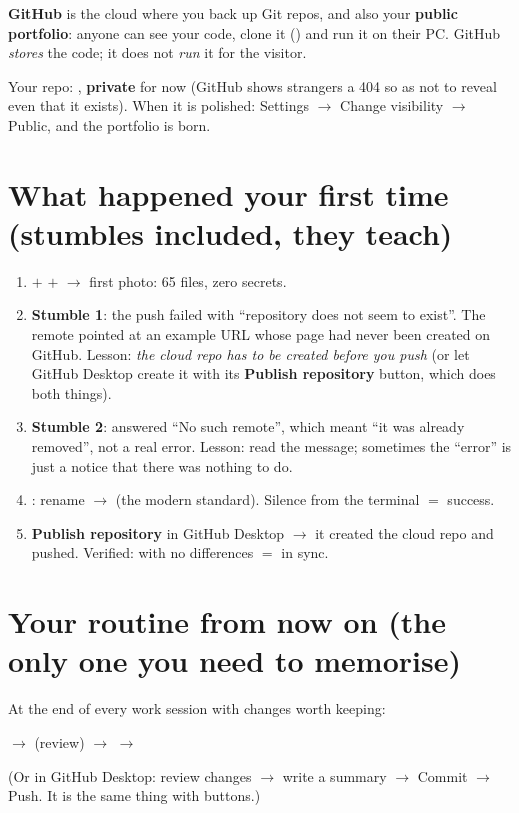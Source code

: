 \documentclass[11pt,a4paper]{article}
\begin{document}
\textbf{GitHub} is the cloud where you back up Git repos, and also your \textbf{public
portfolio}: anyone can see your code, clone it () and run it on their PC.
GitHub \emph{stores} the code; it does not \emph{run} it for the visitor.

Your repo: , \textbf{private} for now (GitHub shows
strangers a 404 so as not to reveal even that it exists). When it is polished:
Settings $\rightarrow$ Change visibility $\rightarrow$ Public, and the portfolio is born.

\section{What happened your first time (stumbles included, they teach)}

\begin{enumerate}
  \item {} $+$  $+$  $\rightarrow$ first
        photo: 65 files, zero secrets.
  \item \textbf{Stumble 1}: the push failed with ``repository does not seem to exist''. The
        remote pointed at an example URL whose page had never been created on GitHub. Lesson:
        \emph{the cloud repo has to be created before you push} (or let GitHub Desktop create
        it with its \textbf{Publish repository} button, which does both things).
  \item \textbf{Stumble 2}:  answered ``No such remote'',
        which meant ``it was already removed'', not a real error. Lesson: read the message;
        sometimes the ``error'' is just a notice that there was nothing to do.
  \item {}: rename  $\rightarrow$  (the
        modern standard). Silence from the terminal $=$ success.
  \item \textbf{Publish repository} in GitHub Desktop $\rightarrow$ it created the cloud repo
        and pushed. Verified:  with no differences $=$ in sync.
\end{enumerate}

\section{Your routine from now on (the only one you need to memorise)}

At the end of every work session with changes worth keeping:
\begin{center}
 \quad$\rightarrow$\quad {} (review) \quad$\rightarrow$\quad
{} \quad$\rightarrow$\quad {}
\end{center}
(Or in GitHub Desktop: review changes $\rightarrow$ write a summary $\rightarrow$ Commit
$\rightarrow$ Push. It is the same thing with buttons.)
\end{document}
